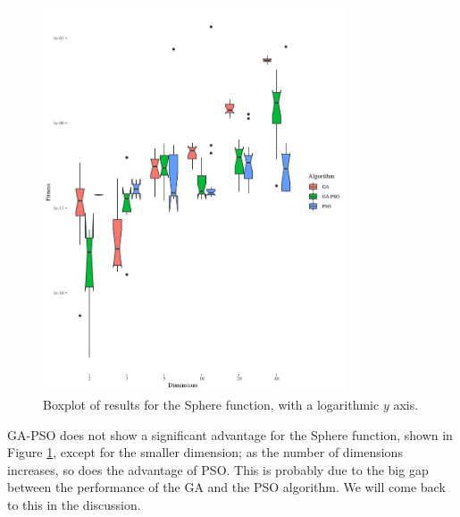 \documentclass[runningheads]{llncs}
\begin{document}
\begin{figure}[h!tb]
  \centering
  \includegraphics[width=0.8\textwidth]{img/sphere-boxplot.png}
  \caption{Boxplot of results for the Sphere function, with a logarithmic $y$ axis.\label{fig:boxplot:sphere}}
\end{figure}
%
GA-PSO does not show a significant advantage for the Sphere
function, shown in Figure \ref{fig:boxplot:sphere}, except for the
smaller dimension; as the number of dimensions increases, so does the
advantage of PSO. This is probably due to the big gap between the
performance of the GA and the PSO algorithm. We will come back to this
in the discussion.
\end{document}
